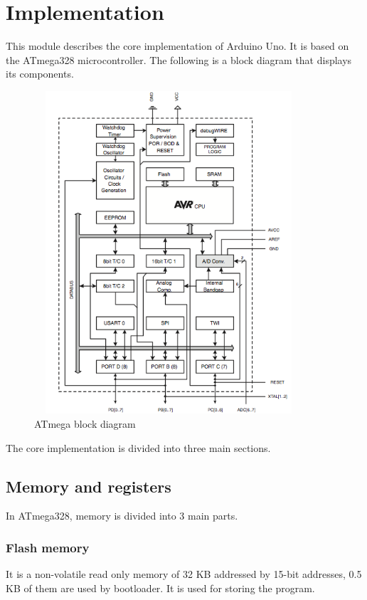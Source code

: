 \chapter{Implementation}
\label{chap:implementation}

This module describes the core implementation of Arduino Uno. It is based on the ATmega328 microcontroller. The following is a block diagram that displays its components.



\begin{figure}[h!]
\centering
\includegraphics[height=12cm, width=10cm]{ArduinoBlockDiagram.png}
\caption{ATmega block diagram \protect\cite{BlockDiagram:URL}}
\label{Arduino Uno block diagram}
\end{figure}



\noindent \large The core implementation is divided into three main sections.

\section{Memory and registers}

In ATmega328, memory is divided into 3 main parts.
\subsection{Flash memory}
It is a non-volatile read only memory of 32 KB addressed by 15-bit addresses, 0.5 KB of them are used by bootloader. It is used for storing the program. 


